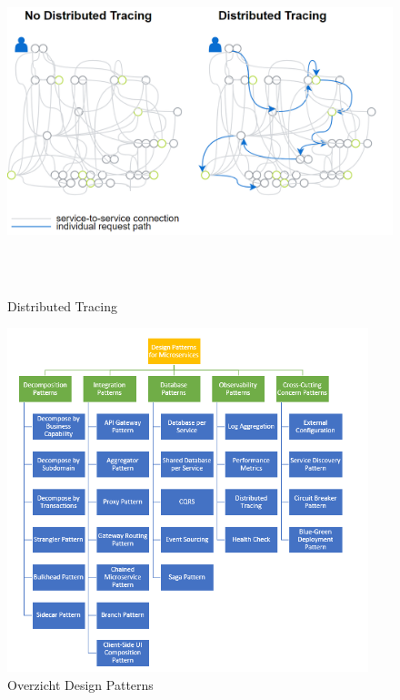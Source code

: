 \begin{figure}[!htb]
    \centering
    \includegraphics[height=10cm]{DistributedTracing.png}
    \caption{Distributed Tracing \label{distributed}}
\end{figure}
\begin{figure}[!htb]
    \centering
    \includegraphics[height=10cm]{DesignPatterns.png}
    \caption{Overzicht Design Patterns \label{overzicht}}
\end{figure}
\newpage
